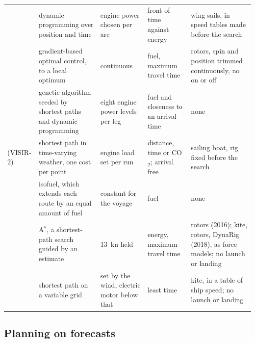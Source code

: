 \begin{table}[tbp]
\begin{tabular}{@{}>{\raggedright\arraybackslash}p{2.4cm}>{\raggedright\arraybackslash}p{3.1cm}>{\raggedright\arraybackslash}p{2.2cm}>{\raggedright\arraybackslash}p{2.7cm}>{\raggedright\arraybackslash}p{3.8cm}@{}}
\citet{wendling2025} & dynamic programming over position and time & engine power chosen per arc & front of time against energy & wing sails, in speed tables made before the search \\ \addlinespace
\citet{dhainaut2025} & gradient-based optimal control, to a local optimum & continuous & fuel, maximum travel time & rotors, spin and position trimmed continuously, no on or off \\ \addlinespace
\citet{wang2021} & genetic algorithm seeded by shortest paths and dynamic programming & eight engine power levels per leg & fuel and closeness to an arrival time & none \\ \addlinespace
\citet{mannarini2024} (VISIR-2) & shortest path in time-varying weather, one cost per point & engine load set per run & distance, time or CO$_2$; arrival free & sailing boat, rig fixed before the search \\ \addlinespace
\citet{marzi2024} & isofuel, which extends each route by an equal amount of fuel & constant for the voyage & fuel & none \\ \addlinespace
\citet{bentin2016,bentin2018} & A$^*$, a shortest-path search guided by an estimate & \SI{13}{kn} held & energy, maximum travel time & rotors (2016); kite, rotors, DynaRig (2018), as force models; no launch or landing \\ \addlinespace
\citet{leskinen2024} & shortest path on a variable grid & set by the wind, electric motor below that & least time & kite, in a table of ship speed; no launch or landing \\
\bottomrule
\end{tabular}
\end{table}

\subsection{Planning on forecasts}
\label{app:forecast_router}


